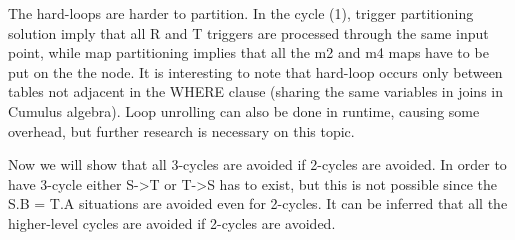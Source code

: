 \documentclass{sig-semester}
\begin{document}
The hard-loops are harder to partition. In the cycle (1), trigger partitioning solution imply that all R and T triggers are processed through the same input point, while map partitioning implies that all the m2 and m4 maps have to be put on the the node. It is interesting to note that hard-loop occurs only between tables not adjacent in the WHERE clause (sharing the same variables in joins in Cumulus algebra). Loop unrolling can also be done in runtime, causing some overhead, but further research is necessary on this topic.

Now we will show that all 3-cycles are avoided if 2-cycles are avoided. In order to have 3-cycle either S->T or T->S has to exist, but this is not possible since the S.B = T.A situations are avoided even for 2-cycles. It can be inferred that all the higher-level cycles are avoided if 2-cycles are avoided.
\end{document}
